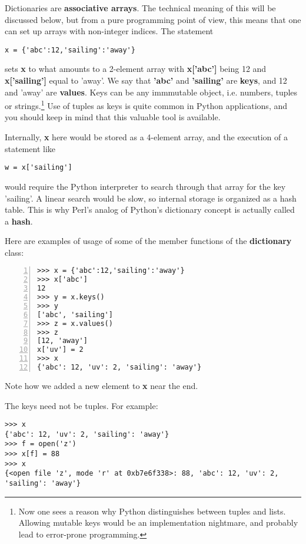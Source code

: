 Dictionaries are {\bf associative arrays}.  The technical meaning of
this will be discussed below, but from a pure programming point of view,
this means that one can set up arrays with non-integer indices.  The
statement

\begin{Verbatim}[fontsize=\relsize{-2}]
x = {'abc':12,'sailing':'away'}
\end{Verbatim}

sets {\bf x} to what amounts to a 2-element array with {\bf x['abc']}
being 12 and {\bf x['sailing']} equal to 'away'.  We say that {\bf
'abc'} and {\bf 'sailing'} are {\bf keys}, and 12 and 'away' are {\bf
values}.  Keys can be any immmutable object, i.e. numbers, tuples or
strings.\footnote{Now one sees a reason why Python distinguishes between
tuples and lists.  Allowing mutable keys would be an implementation
nightmare, and probably lead to error-prone programming.}  Use of tuples
as keys is quite common in Python applications, and you should keep in
mind that this valuable tool is available.

Internally, {\bf x} here would be stored as a 4-element array, and the
execution of a statement like

\begin{Verbatim}[fontsize=\relsize{-2}]
w = x['sailing']
\end{Verbatim}

would require the Python interpreter to search through that array for
the key 'sailing'.  A linear search would be slow, so internal storage
is organized as a hash table.  This is why Perl's analog of Python's
dictionary concept is actually called a {\bf hash}.

Here are examples of usage of some of the member functions of the {\bf
dictionary} class:

\begin{Verbatim}[fontsize=\relsize{-2},numbers=left]
>>> x = {'abc':12,'sailing':'away'}
>>> x['abc']
12
>>> y = x.keys()
>>> y
['abc', 'sailing']
>>> z = x.values()
>>> z
[12, 'away']
x['uv'] = 2
>>> x
{'abc': 12, 'uv': 2, 'sailing': 'away'}
\end{Verbatim} 

Note how we added a new element to {\bf x} near the end.

The keys need not be tuples.  For example:

\begin{Verbatim}[fontsize=\relsize{-2}]
>>> x
{'abc': 12, 'uv': 2, 'sailing': 'away'}
>>> f = open('z')
>>> x[f] = 88
>>> x
{<open file 'z', mode 'r' at 0xb7e6f338>: 88, 'abc': 12, 'uv': 2, 'sailing': 'away'}
\end{Verbatim}

